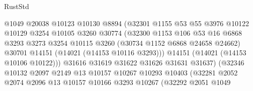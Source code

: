 \begin{lexlean}{RustStd}
\begin{coremodule}
                                  @1049
                                  @20038
                                  @10123
                                  @10130
                                  @8894
                                  (@32301
                                    @1155
                                    @53
                                    @55
                                    @3976
                                    @10122
                                    @10129
                                    @3254
                                    @10105
                                    @3260
                                    @30774
                                    (@32300
                                      @1153
                                      @106
                                      @53
                                      @16
                                      @6868
                                      @3293
                                      @3273
                                      @3254
                                      @10115
                                      @3260
                                      (@30734 @1152 @6868 @24658 @24662)
                                      @30701
                                      @14151
                                      (@14021 (@14153 @10116 @3293)))
                                    @14151
                                    (@14021 (@14153 @10106 @10122)))
                                  @31616
                                  @31619
                                  @31622
                                  @31626
                                  @31631
                                  @31637)
                                (@32346
                                  @10132
                                  @2097
                                  @2149
                                  @13
                                  @10157
                                  @10267
                                  @10293
                                  @10403
                                  (@32281
                                    @2052
                                    @2074
                                    @2096
                                    @13
                                    @10157
                                    @10166
                                    @3293
                                    @10267
                                    (@32292
                                      @2051
                                      @1049

\end{coremodule}
\end{lexlean}
